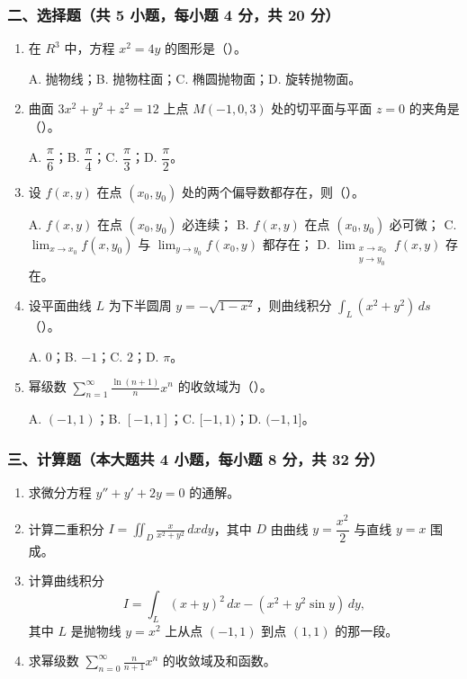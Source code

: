 \subsubsection*{二、选择题（共 5 小题，每小题 4 分，共 20 分）}
\begin{enumerate}
  \item 在 $R^3$ 中，方程 $x^2=4y$ 的图形是（\quad）。

  A. 抛物线；\quad B. 抛物柱面；\quad C. 椭圆抛物面；\quad D. 旋转抛物面。

  \item 曲面 $3x^2+y^2+z^2=12$ 上点 $M(-1,0,3)$ 处的切平面与平面 $z=0$ 的夹角是（\quad）。

  A. $\dfrac{\pi}{6}$；\quad B. $\dfrac{\pi}{4}$；\quad C. $\dfrac{\pi}{3}$；\quad D. $\dfrac{\pi}{2}$。

  \item 设 $f(x,y)$ 在点 $(x_0,y_0)$ 处的两个偏导数都存在，则（\quad）。

  A. $f(x,y)$ 在点 $(x_0,y_0)$ 必连续；\quad
  B. $f(x,y)$ 在点 $(x_0,y_0)$ 必可微；\quad
  C. $\displaystyle\lim_{x\to x_0}f(x,y_0)$ 与 $\displaystyle\lim_{y\to y_0}f(x_0,y)$ 都存在；\quad
  D. $\displaystyle\lim_{\substack{x\to x_0\\y\to y_0}}f(x,y)$ 存在。

  \item 设平面曲线 $L$ 为下半圆周 $y=-\sqrt{1-x^2}$，则曲线积分 $\displaystyle\int_L(x^2+y^2)\,ds$（\quad）。

  A. $0$；\quad B. $-1$；\quad C. $2$；\quad D. $\pi$。

  \item 幂级数 $\displaystyle\sum_{n=1}^{\infty}\frac{\ln(n+1)}{n}x^n$ 的收敛域为（\quad）。

  A. $(-1,1)$；\quad B. $[-1,1]$；\quad C. $[-1,1)$；\quad D. $(-1,1]$。
\end{enumerate}

\subsubsection*{三、计算题（本大题共 4 小题，每小题 8 分，共 32 分）}
\begin{enumerate}
  \item 求微分方程 $y''+y'+2y=0$ 的通解。
  \item 计算二重积分 $\displaystyle I=\iint_D\frac{x}{x^2+y^2}\,dxdy$，其中 $D$ 由曲线 $y=\dfrac{x^2}{2}$ 与直线 $y=x$ 围成。
  \item 计算曲线积分
  \[
  I=\int_L (x+y)^2\,dx-(x^2+y^2\sin y)\,dy,
  \]
  其中 $L$ 是抛物线 $y=x^2$ 上从点 $(-1,1)$ 到点 $(1,1)$ 的那一段。
  \item 求幂级数 $\displaystyle\sum_{n=0}^{\infty}\frac{n}{n+1}x^n$ 的收敛域及和函数。
\end{enumerate}

